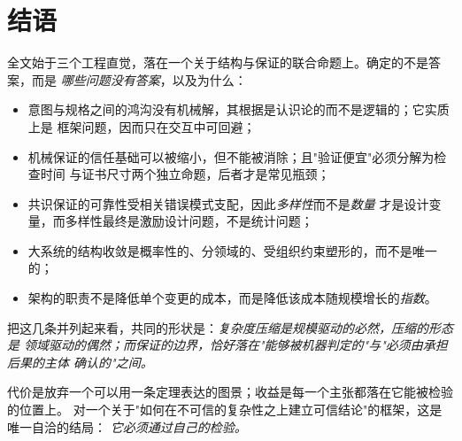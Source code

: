 \section{结语}

全文始于三个工程直觉，落在一个关于结构与保证的联合命题上。确定的不是答案，而是
\emph{哪些问题没有答案}，以及为什么：

\begin{itemize}
\item 意图与规格之间的鸿沟没有机械解，其根据是认识论的而不是逻辑的；它实质上是
      框架问题，因而只在交互中可回避；
\item 机械保证的信任基础可以被缩小，但不能被消除；且"验证便宜"必须分解为检查时间
      与证书尺寸两个独立命题，后者才是常见瓶颈；
\item 共识保证的可靠性受相关错误模式支配，因此\emph{多样性}而不是\emph{数量}
      才是设计变量，而多样性最终是激励设计问题，不是统计问题；
\item 大系统的结构收敛是概率性的、分领域的、受组织约束塑形的，而不是唯一的；
\item 架构的职责不是降低单个变更的成本，而是降低该成本随规模增长的\emph{指数}。
\end{itemize}

把这几条并列起来看，共同的形状是：\emph{复杂度压缩是规模驱动的必然，压缩的形态是
领域驱动的偶然；而保证的边界，恰好落在"能够被机器判定的"与"必须由承担后果的主体
确认的"之间。}

代价是放弃一个可以用一条定理表达的图景；收益是每一个主张都落在它能被检验的位置上。
对一个关于"如何在不可信的复杂性之上建立可信结论"的框架，这是唯一自洽的结局：
\emph{它必须通过自己的检验。}
